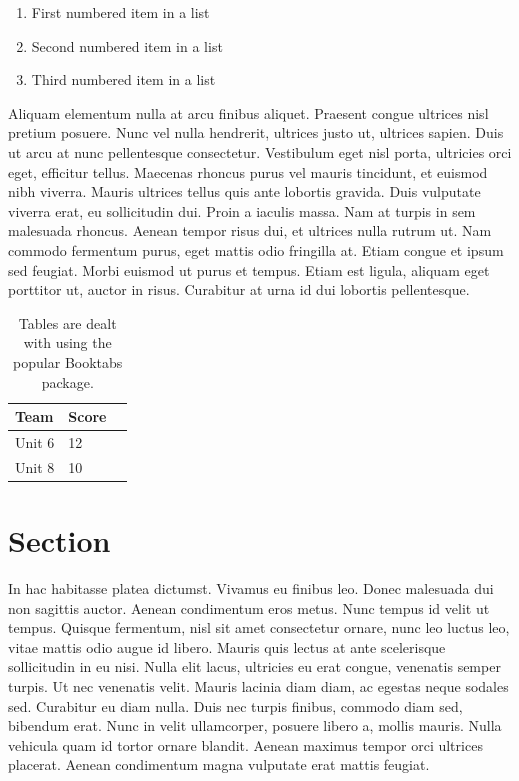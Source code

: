 \documentclass[10pt, a4paper, twocolumn]{article} %
\begin{document}
\begin{enumerate}
	\item First numbered item in a list
	\item Second numbered item in a list
	\item Third numbered item in a list
\end{enumerate}

Aliquam elementum nulla at arcu finibus aliquet. Praesent congue ultrices nisl pretium posuere. Nunc vel nulla hendrerit, ultrices justo ut, ultrices sapien. Duis ut arcu at nunc pellentesque consectetur. Vestibulum eget nisl porta, ultricies orci eget, efficitur tellus. Maecenas rhoncus purus vel mauris tincidunt, et euismod nibh viverra. Mauris ultrices tellus quis ante lobortis gravida. Duis vulputate viverra erat, eu sollicitudin dui. Proin a iaculis massa. Nam at turpis in sem malesuada rhoncus. Aenean tempor risus dui, et ultrices nulla rutrum ut. Nam commodo fermentum purus, eget mattis odio fringilla at. Etiam congue et ipsum sed feugiat. Morbi euismod ut purus et tempus. Etiam est ligula, aliquam eget porttitor ut, auctor in risus. Curabitur at urna id dui lobortis pellentesque.

\begin{table}
	\caption{Tables are dealt with using the popular Booktabs package.}
	\centering
	\begin{tabular}{llr}
		\toprule
		Team & Score \\
		\midrule
		Unit 6 & 12 \\
		Unit 8 & 10 \\
		\bottomrule
	\end{tabular}
\end{table}


\section{Section}

In hac habitasse platea dictumst. Vivamus eu finibus leo. Donec malesuada dui non sagittis auctor. Aenean condimentum eros metus. Nunc tempus id velit ut tempus. Quisque fermentum, nisl sit amet consectetur ornare, nunc leo luctus leo, vitae mattis odio augue id libero. Mauris quis lectus at ante scelerisque sollicitudin in eu nisi. Nulla elit lacus, ultricies eu erat congue, venenatis semper turpis. Ut nec venenatis velit. Mauris lacinia diam diam, ac egestas neque sodales sed. Curabitur eu diam nulla. Duis nec turpis finibus, commodo diam sed, bibendum erat. Nunc in velit ullamcorper, posuere libero a, mollis mauris. Nulla vehicula quam id tortor ornare blandit. Aenean maximus tempor orci ultrices placerat. Aenean condimentum magna vulputate erat mattis feugiat.
\end{document}
